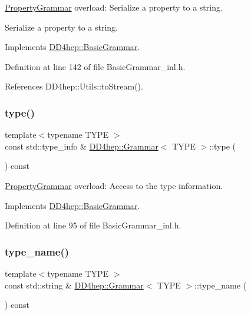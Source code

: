 \hyperlink{class_d_d4hep_1_1_property_grammar}{Property\+Grammar} overload\+: Serialize a property to a string. 

Serialize a property to a string. 

Implements \hyperlink{class_d_d4hep_1_1_basic_grammar_a92fb01e1333540f417ef8151e774fd72}{D\+D4hep\+::\+Basic\+Grammar}.



Definition at line 142 of file Basic\+Grammar\+\_\+inl.\+h.



References D\+D4hep\+::\+Utils\+::to\+Stream().

\hypertarget{class_d_d4hep_1_1_grammar_aff59cecd068a31460b5323552fd711ce}{}\label{class_d_d4hep_1_1_grammar_aff59cecd068a31460b5323552fd711ce} 
\subsubsection{\texorpdfstring{type()}{type()}}
{\footnotesize\ttfamily template$<$typename T\+Y\+PE $>$ \\
const std\+::type\+\_\+info \& \hyperlink{class_d_d4hep_1_1_grammar}{D\+D4hep\+::\+Grammar}$<$ T\+Y\+PE $>$\+::type (\begin{DoxyParamCaption}{ }\end{DoxyParamCaption}) const\hspace{0.3cm}{\ttfamily [virtual]}}



\hyperlink{class_d_d4hep_1_1_property_grammar}{Property\+Grammar} overload\+: Access to the type information. 



Implements \hyperlink{class_d_d4hep_1_1_basic_grammar_a697d38c53f67a86bb182350dad284402}{D\+D4hep\+::\+Basic\+Grammar}.



Definition at line 95 of file Basic\+Grammar\+\_\+inl.\+h.

\hypertarget{class_d_d4hep_1_1_grammar_a26bd74714c2c52cd9102bea266607c75}{}\label{class_d_d4hep_1_1_grammar_a26bd74714c2c52cd9102bea266607c75} 
\subsubsection{\texorpdfstring{type\+\_\+name()}{type\_name()}}
{\footnotesize\ttfamily template$<$typename T\+Y\+PE $>$ \\
const std\+::string \& \hyperlink{class_d_d4hep_1_1_grammar}{D\+D4hep\+::\+Grammar}$<$ T\+Y\+PE $>$\+::type\+\_\+name (\begin{DoxyParamCaption}{ }\end{DoxyParamCaption}) const\hspace{0.3cm}{\ttfamily [virtual]}}



